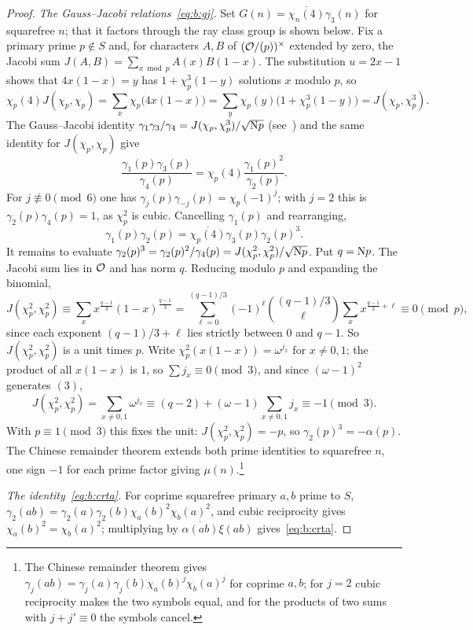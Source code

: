 \begin{proof}
\emph{The Gauss--Jacobi relations~\eqref{eq:b:gj}.} Set $G(n)=\overline{\chi_n(4)}\gamma_3(n)$ for squarefree $n$; that it factors through the ray class group is shown below. Fix a primary prime $p\notin S$ and, for characters $A,B$ of $(\mathcal{O}/(p))^\times$ extended by zero, the Jacobi sum $J(A,B)=\sum_{x\bmod p}A(x)B(1-x)$. The substitution $u=2x-1$ shows that $4x(1-x)=y$ has $1+\chi_p^3(1-y)$ solutions $x$ modulo $p$, so
\[
  \chi_p(4)J(\chi_p,\chi_p)=\sum_x\chi_p\bigl(4x(1-x)\bigr)=\sum_y\chi_p(y)\bigl(1+\chi_p^3(1-y)\bigr)=J(\chi_p,\chi_p^3).
\]
The Gauss--Jacobi identity $\gamma_1\gamma_3/\gamma_4=J(\chi_p,\chi_p^3)/\sqrt{\mathrm{N} p}$ (see~\cite[(3.18)]{IK04}) and the same identity for $J(\chi_p,\chi_p)$ give
\[
  \frac{\gamma_1(p)\gamma_3(p)}{\gamma_4(p)}=\chi_p(4)\frac{\gamma_1(p)^2}{\gamma_2(p)}.
\]
For $j\not\equiv0\pmod6$ one has $\gamma_j(p)\gamma_{-j}(p)=\chi_p(-1)^j$; with $j=2$ this is $\gamma_2(p)\gamma_4(p)=1$, as $\chi_p^2$ is cubic. Cancelling $\gamma_1(p)$ and rearranging,
\[
  \gamma_1(p)\gamma_2(p)=\overline{\chi_p(4)}\gamma_3(p)\gamma_2(p)^3.
\]
It remains to evaluate $\gamma_2(p)^3=\gamma_2(p)^2/\gamma_4(p)=J(\chi_p^2,\chi_p^2)/\sqrt{\mathrm{N} p}$. Put $q=\mathrm{N} p$. The Jacobi sum lies in $\mathcal{O}$ and has norm $q$. Reducing modulo $p$ and expanding the binomial,
\[
  J(\chi_p^2,\chi_p^2)\equiv\sum_x x^{\frac{q-1}3}(1-x)^{\frac{q-1}3}=\sum_{\ell=0}^{(q-1)/3}(-1)^\ell\binom{(q-1)/3}\ell\sum_xx^{\frac{q-1}3+\ell}\equiv0\pmod p,
\]
since each exponent $(q-1)/3+\ell$ lies strictly between $0$ and $q-1$. So $J(\chi_p^2,\chi_p^2)$ is a unit times $p$. Write $\chi_p^2(x(1-x))=\omega^{j_x}$ for $x\ne0,1$; the product of all $x(1-x)$ is $1$, so $\sum j_x\equiv0\pmod3$, and since $(\omega-1)^2$ generates $(3)$,
\[
  J(\chi_p^2,\chi_p^2)=\sum_{x\ne0,1}\omega^{j_x}\equiv(q-2)+(\omega-1)\sum_{x\ne0,1}j_x\equiv-1\pmod3.
\]
With $p\equiv1\pmod3$ this fixes the unit: $J(\chi_p^2,\chi_p^2)=-p$, so $\gamma_2(p)^3=-\alpha(p)$. The Chinese remainder theorem extends both prime identities to squarefree $n$, one sign $-1$ for each prime factor giving $\mu(n)$.\footnote{The Chinese remainder theorem gives $\gamma_j(ab)=\gamma_j(a)\gamma_j(b)\chi_a(b)^j\chi_b(a)^j$ for coprime $a,b$; for $j=2$ cubic reciprocity makes the two symbols equal, and for the products of two sums with $j+j'\equiv0$ the symbols cancel.}

\emph{The identity~\eqref{eq:b:crta}.} For coprime squarefree primary $a,b$ prime to $S$, $\gamma_2(ab)=\gamma_2(a)\gamma_2(b)\chi_a(b)^2\chi_b(a)^2$, and cubic reciprocity gives $\chi_a(b)^2=\chi_b(a)^2$; multiplying by $\overline{\alpha(ab)}\xi(ab)$ gives~\eqref{eq:b:crta}.


\end{proof}
